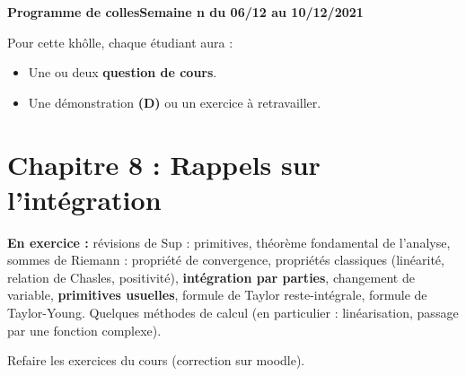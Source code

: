 \documentclass[twoside,a4paper,french,1pt]{VcCours}
\begin{document}

\begin{center}
\large\bf
Programme de collesSemaine n du 06/12 au 10/12/2021
\end{center}
\separationTitre


Pour cette khôlle, chaque étudiant aura :
\begin{itemize}
\item Une ou deux \textbf{question de cours}.
\item Une démonstration \textbf{(D)} ou un exercice à retravailler.
\end{itemize}


\section*{Chapitre 8 : Rappels sur l'intégration}
  
  \textbf{En exercice :} révisions de Sup : primitives, théorème fondamental de l'analyse, sommes de Riemann : propriété de convergence, propriétés classiques (linéarité, relation de Chasles, positivité), \textbf{intégration par parties}, changement de variable, \textbf{primitives usuelles}, formule de Taylor reste-intégrale, formule de Taylor-Young. Quelques méthodes de calcul (en particulier : linéarisation, passage par une fonction complexe).

  Refaire les exercices du cours (correction sur moodle).
  
\end{document}
